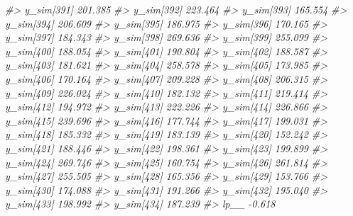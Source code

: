 \documentclass[
  10pt,
  italian,
  a4paper,
  extrafontsizes,onecolumn,openright
  ]{memoir}
\newenvironment{Shaded}{\begin{snugshade}}{\end{snugshade}}
\newcommand{\CommentTok}[1]{\textcolor[rgb]{0.56,0.35,0.01}{\textit{#1}}}
\begin{document}
\begin{Shaded}
\begin{Highlighting}[]
\CommentTok{\#\textgreater{}   y\_sim[391] 201.385}
\CommentTok{\#\textgreater{}   y\_sim[392] 223.464}
\CommentTok{\#\textgreater{}   y\_sim[393] 165.554}
\CommentTok{\#\textgreater{}   y\_sim[394] 206.609}
\CommentTok{\#\textgreater{}   y\_sim[395] 186.975}
\CommentTok{\#\textgreater{}   y\_sim[396] 170.165}
\CommentTok{\#\textgreater{}   y\_sim[397] 184.343}
\CommentTok{\#\textgreater{}   y\_sim[398] 269.636}
\CommentTok{\#\textgreater{}   y\_sim[399] 255.099}
\CommentTok{\#\textgreater{}   y\_sim[400] 188.054}
\CommentTok{\#\textgreater{}   y\_sim[401] 190.804}
\CommentTok{\#\textgreater{}   y\_sim[402] 188.587}
\CommentTok{\#\textgreater{}   y\_sim[403] 181.621}
\CommentTok{\#\textgreater{}   y\_sim[404] 258.578}
\CommentTok{\#\textgreater{}   y\_sim[405] 173.985}
\CommentTok{\#\textgreater{}   y\_sim[406] 170.164}
\CommentTok{\#\textgreater{}   y\_sim[407] 209.228}
\CommentTok{\#\textgreater{}   y\_sim[408] 206.315}
\CommentTok{\#\textgreater{}   y\_sim[409] 226.024}
\CommentTok{\#\textgreater{}   y\_sim[410] 182.132}
\CommentTok{\#\textgreater{}   y\_sim[411] 219.414}
\CommentTok{\#\textgreater{}   y\_sim[412] 194.972}
\CommentTok{\#\textgreater{}   y\_sim[413] 222.226}
\CommentTok{\#\textgreater{}   y\_sim[414] 226.866}
\CommentTok{\#\textgreater{}   y\_sim[415] 239.696}
\CommentTok{\#\textgreater{}   y\_sim[416] 177.744}
\CommentTok{\#\textgreater{}   y\_sim[417] 199.031}
\CommentTok{\#\textgreater{}   y\_sim[418] 185.332}
\CommentTok{\#\textgreater{}   y\_sim[419] 183.139}
\CommentTok{\#\textgreater{}   y\_sim[420] 152.242}
\CommentTok{\#\textgreater{}   y\_sim[421] 188.446}
\CommentTok{\#\textgreater{}   y\_sim[422] 198.361}
\CommentTok{\#\textgreater{}   y\_sim[423] 199.899}
\CommentTok{\#\textgreater{}   y\_sim[424] 269.746}
\CommentTok{\#\textgreater{}   y\_sim[425] 160.754}
\CommentTok{\#\textgreater{}   y\_sim[426] 261.814}
\CommentTok{\#\textgreater{}   y\_sim[427] 255.505}
\CommentTok{\#\textgreater{}   y\_sim[428] 165.356}
\CommentTok{\#\textgreater{}   y\_sim[429] 153.766}
\CommentTok{\#\textgreater{}   y\_sim[430] 174.088}
\CommentTok{\#\textgreater{}   y\_sim[431] 191.266}
\CommentTok{\#\textgreater{}   y\_sim[432] 195.040}
\CommentTok{\#\textgreater{}   y\_sim[433] 198.992}
\CommentTok{\#\textgreater{}   y\_sim[434] 187.239}
\CommentTok{\#\textgreater{}   lp\_\_        {-}0.618}
\end{Highlighting}
\end{Shaded}
\end{document}

